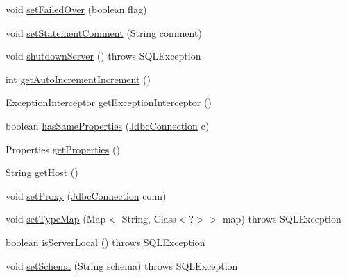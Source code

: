 \begin{DoxyCompactItemize}
void \mbox{\hyperlink{classcom_1_1mysql_1_1cj_1_1jdbc_1_1_connection_wrapper_aaa41827ca4520529797d55c4f8834f76}{set\+Failed\+Over}} (boolean flag)
\item 
void \mbox{\hyperlink{classcom_1_1mysql_1_1cj_1_1jdbc_1_1_connection_wrapper_a79c9fe73cc7069028015a7e3e6a383fb}{set\+Statement\+Comment}} (String comment)
\item 
void \mbox{\hyperlink{classcom_1_1mysql_1_1cj_1_1jdbc_1_1_connection_wrapper_a0989b3c99444046219ef68a1e15863c9}{shutdown\+Server}} ()  throws S\+Q\+L\+Exception 
\item 
int \mbox{\hyperlink{classcom_1_1mysql_1_1cj_1_1jdbc_1_1_connection_wrapper_a0855a0981bb14e92fee22c3591d95175}{get\+Auto\+Increment\+Increment}} ()
\item 
\mbox{\hyperlink{interfacecom_1_1mysql_1_1cj_1_1exceptions_1_1_exception_interceptor}{Exception\+Interceptor}} \mbox{\hyperlink{classcom_1_1mysql_1_1cj_1_1jdbc_1_1_connection_wrapper_a3f7f70fcff77c01e2e8d4bf12802d0e0}{get\+Exception\+Interceptor}} ()
\item 
boolean \mbox{\hyperlink{classcom_1_1mysql_1_1cj_1_1jdbc_1_1_connection_wrapper_a10dadfff0a559ba28835c1a0e95379d6}{has\+Same\+Properties}} (\mbox{\hyperlink{interfacecom_1_1mysql_1_1cj_1_1jdbc_1_1_jdbc_connection}{Jdbc\+Connection}} c)
\item 
Properties \mbox{\hyperlink{classcom_1_1mysql_1_1cj_1_1jdbc_1_1_connection_wrapper_a76eea5af4534baf71ff0852b0c0f6f9c}{get\+Properties}} ()
\item 
String \mbox{\hyperlink{classcom_1_1mysql_1_1cj_1_1jdbc_1_1_connection_wrapper_a749196b6111ba521f0920d4ea3b7db81}{get\+Host}} ()
\item 
void \mbox{\hyperlink{classcom_1_1mysql_1_1cj_1_1jdbc_1_1_connection_wrapper_a2b781b548795804db1bd1d82d1b381fb}{set\+Proxy}} (\mbox{\hyperlink{interfacecom_1_1mysql_1_1cj_1_1jdbc_1_1_jdbc_connection}{Jdbc\+Connection}} conn)
\item 
void \mbox{\hyperlink{classcom_1_1mysql_1_1cj_1_1jdbc_1_1_connection_wrapper_aab42e9d0d2398c58f88785a7fcba8369}{set\+Type\+Map}} (Map$<$ String, Class$<$?$>$$>$ map)  throws S\+Q\+L\+Exception 
\item 
boolean \mbox{\hyperlink{classcom_1_1mysql_1_1cj_1_1jdbc_1_1_connection_wrapper_afe8fab04e181ccd81e0e5bb3881361cd}{is\+Server\+Local}} ()  throws S\+Q\+L\+Exception 
\item 
void \mbox{\hyperlink{classcom_1_1mysql_1_1cj_1_1jdbc_1_1_connection_wrapper_aab033f6e889c46495c2b6bff7705d5ae}{set\+Schema}} (String schema)  throws S\+Q\+L\+Exception 
$$
\end{DoxyCompactItemize}
